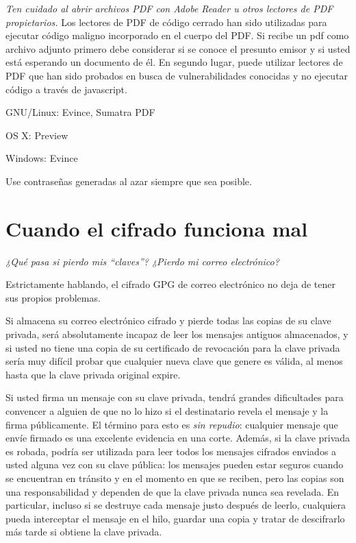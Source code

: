 \documentclass[10pt,a5paper,twoside,,]{book}
\begin{document}
\emph{Ten cuidado al abrir archivos PDF con Adobe Reader u otros
lectores de PDF propietarios.} Los lectores de PDF de código cerrado han
sido utilizadas para ejecutar código maligno incorporado en el cuerpo
del PDF. Si recibe un pdf como archivo adjunto primero debe considerar
si se conoce el presunto emisor y si usted está esperando un documento
de él. En segundo lugar, puede utilizar lectores de PDF que han sido
probados en busca de vulnerabilidades conocidas y no ejecutar código a
través de javascript.

GNU/Linux: Evince, Sumatra PDF

OS X: Preview

Windows: Evince

Use contraseñas generadas al azar siempre que sea posible.

\section{Cuando el cifrado funciona
mal}\label{cuando-el-cifrado-funciona-mal}

\emph{¿Qué pasa si pierdo mis ``claves''? ¿Pierdo mi correo
electrónico?}

Estrictamente hablando, el cifrado GPG de correo electrónico no deja de
tener sus propios problemas.

Si almacena su correo electrónico cifrado y pierde todas las copias de
su clave privada, será absolutamente incapaz de leer los mensajes
antiguos almacenados, y si usted no tiene una copia de su certificado de
revocación para la clave privada sería muy difícil probar que cualquier
nueva clave que genere es válida, al menos hasta que la clave privada
original expire.

Si usted firma un mensaje con su clave privada, tendrá grandes
dificultades para convencer a alguien de que no lo hizo si el
destinatario revela el mensaje y la firma públicamente. El término para
esto es \emph{sin repudio}: cualquier mensaje que envíe firmado es una
excelente evidencia en una corte. Además, si la clave privada es robada,
podría ser utilizada para leer todos los mensajes cifrados enviados a
usted alguna vez con su clave pública: los mensajes pueden estar seguros
cuando se encuentran en tránsito y en el momento en que se reciben, pero
las copias son una responsabilidad y dependen de que la clave privada
nunca sea revelada. En particular, incluso si se destruye cada mensaje
justo después de leerlo, cualquiera pueda interceptar el mensaje en el
hilo, guardar una copia y tratar de descifrarlo más tarde si obtiene la
clave privada.
\end{document}
